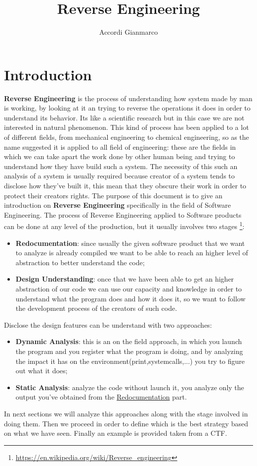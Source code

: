 \documentclass{article}
\author{Accordi Gianmarco}
\title{Reverse Engineering}
\date{}
\begin{document}
\maketitle

\section{Introduction}

\textbf{Reverse Engineering} is the process of understanding how system made by man is working, by looking at it an trying to reverse the operations it does in order to understand its behavior.
Its like a scientific research but in this case we are not interested in natural phenomenon.
This kind of process has been applied to a lot of different fields, from mechanical engineering to chemical engineering, so as the name suggested it is applied to all field of engineering: these are the fields in which we can take apart the work done by other human being and trying to understand how they have build such a system.
The necessity of this such an analysis of a system is usually required because creator of a system tends to disclose how they've built it, this mean that they obscure their work in order to protect their creators rights.
The purpose of this document is to give an introduction on \textbf{Reverse Engineering} specifically in the field of Software Engineering.
The process of Reverse Engineering applied to Software products can be done at any level of the production, but it usually involves two stages \footnote{\url{https://en.wikipedia.org/wiki/Reverse_engineering}}:
\begin{itemize}
    \item \textbf{Redocumentation}: since usually the given software product that we want to analyze is already compiled we want to be able to reach an higher level of abstraction to better understand the code;
    \item \textbf{Design Understanding}: once that we have been able to get an higher abstraction of our code we can use our capacity and knowledge in order to understand what the program does and how it does it, so we want to follow the development process of the creators of such code.
\end{itemize}
Disclose the design features can be understand with two approaches:
\begin{itemize} 
    \item \textbf{Dynamic Analysis}: this is an on the field approach, in which you launch the program and you register what the program is doing, and by analyzing the impact it has on the environment(print,systemcalls,...) you try to figure out what it does;
    \item \textbf{Static Analysis}: analyze the code without launch it, you analyze only the output you've obtained from the \underline{Redocumentation} part.
\end{itemize} 
In next sections we will analyze this approaches along with the stage involved in doing them.
Then we proceed in order to define which is the best strategy based on what we have seen. Finally an example is provided taken from a CTF. 
\end{document}
